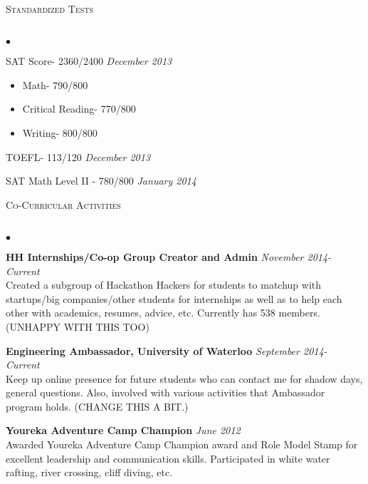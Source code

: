 \documentclass{article}
\newcommand{\lineunder}{\vspace*{-8pt} \\ \hspace*{-18pt} \hrulefill \\}
\newcommand{\header}[1]{{\hspace*{-15pt}\vspace*{6pt} \textsc{#1}} \vspace*{-6pt} \lineunder}
\newenvironment{achievements}{\begin{list}{$\bullet$}{\topsep 0pt \itemsep -1.5pt \leftmargin 5pt}}{\vspace*{4pt}\end{list}}
\begin{document}
\vspace{7pt}

\header{Standardized Tests}
\begin{achievements}
\item SAT Score- 2360/2400 \hfill \textit {December 2013}
    \setlength\itemsep{0.03em}
     \vspace{-1.5ex}\\
     \begin{itemize}
     \setlength\itemsep{0.03em}
        \item Math- 790/800
        \item Critical Reading- 770/800
        \item Writing- 800/800
    \end{itemize}
\vspace{-1ex}
\item TOEFL- 113/120 \hfill \textit {December 2013}
\vspace{-0.4ex}
\item SAT Math Level II - 780/800 \hfill \textit {January 2014}
\end{achievements}

\vspace{7pt}

\header{Co-Curricular Activities}
\begin{achievements}
\item \textbf{HH Internships/Co-op Group Creator and Admin} \hfill \textit {November 2014- Current}
\\ Created a subgroup of Hackathon Hackers for students to matchup with startups/big companies/other students for internships as well as to help each other with academics, resumes, advice, etc. Currently has 538 members.(UNHAPPY WITH THIS TOO)
\item \textbf{Engineering Ambassador, University of Waterloo} \hfill \textit {September 2014- Current}
\\Keep up online presence for future students who can contact me for shadow days, general questions. Also, involved with various activities that Ambassador program holds. (CHANGE THIS A BIT.)
\item \textbf{Youreka Adventure Camp Champion} \hfill \textit {June 2012}
\\ Awarded Youreka Adventure Camp Champion award and Role Model Stamp for excellent leadership and communication skills. Participated in white water rafting, river crossing, cliff diving, etc.
\end{achievements}

\newpage
\end{document}
